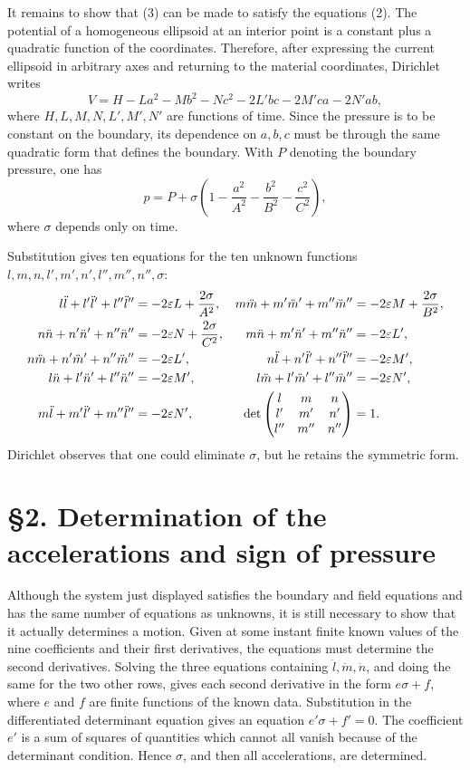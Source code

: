 \documentclass[11pt]{article}
\newcommand{\eps}{\varepsilon}
\begin{document}
It remains to show that (3) can be made to satisfy the equations (2).  The potential of a homogeneous ellipsoid at an interior point is a constant plus a quadratic function of the coordinates.  Therefore, after expressing the current ellipsoid in arbitrary axes and returning to the material coordinates, Dirichlet writes
\begin{equation}
 V=H-La^2-Mb^2-Nc^2-2L'bc-2M'ca-2N'ab,
\end{equation}
where \(H,L,M,N,L',M',N'\) are functions of time.  Since the pressure is to be constant on the boundary, its dependence on \(a,b,c\) must be through the same quadratic form that defines the boundary.  With \(P\) denoting the boundary pressure, one has
\begin{equation}
 p=P+\sigma\left(1-\frac{a^2}{A^2}-\frac{b^2}{B^2}-\frac{c^2}{C^2}\right),
\end{equation}
where \(\sigma\) depends only on time.

Substitution gives ten equations for the ten unknown functions \(l,m,n,l',m',n',l'',m'',n'',\sigma\):
\begin{align}
 l\ddot l+l'\ddot l'+l''\ddot l''&=-2\eps L+\frac{2\sigma}{A^2},&
 m\ddot m+m'\ddot m'+m''\ddot m''&=-2\eps M+\frac{2\sigma}{B^2},\notag\\
 n\ddot n+n'\ddot n'+n''\ddot n''&=-2\eps N+\frac{2\sigma}{C^2},&
 m\ddot n+m'\ddot n'+m''\ddot n''&=-2\eps L',\notag\\
 n\ddot m+n'\ddot m'+n''\ddot m''&=-2\eps L',&
 n\ddot l+n'\ddot l'+n''\ddot l''&=-2\eps M',\\
 l\ddot n+l'\ddot n'+l''\ddot n''&=-2\eps M',&
 l\ddot m+l'\ddot m'+l''\ddot m''&=-2\eps N',\notag\\
 m\ddot l+m'\ddot l'+m''\ddot l''&=-2\eps N',&
 \det\begin{pmatrix}l&m&n\\ l'&m'&n'\\ l''&m''&n''\end{pmatrix}&=1.\notag
\end{align}
Dirichlet observes that one could eliminate \(\sigma\), but he retains the symmetric form.

\section*{\S2. Determination of the accelerations and sign of pressure}

Although the system just displayed satisfies the boundary and field equations and has the same number of equations as unknowns, it is still necessary to show that it actually determines a motion.  Given at some instant finite known values of the nine coefficients and their first derivatives, the equations must determine the second derivatives.  Solving the three equations containing \(\ddot l,\ddot m,\ddot n\), and doing the same for the two other rows, gives each second derivative in the form \(e\sigma+f\), where \(e\) and \(f\) are finite functions of the known data.  Substitution in the differentiated determinant equation gives an equation \(e'\sigma+f'=0\).  The coefficient \(e'\) is a sum of squares of quantities which cannot all vanish because of the determinant condition.  Hence \(\sigma\), and then all accelerations, are determined.
\end{document}

